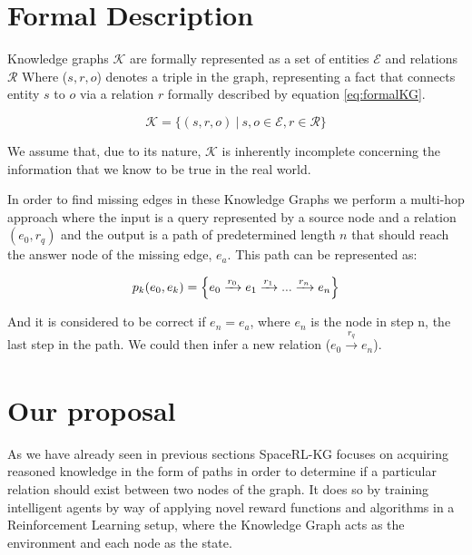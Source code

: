 \section{Formal Description}\label{sec:spacerl-formal_description}


Knowledge graphs $\mathcal{K}$ are formally represented as a set of entities $\mathcal{E}$ and relations $ \mathcal{R}$ Where ($s, r, o$) denotes a triple in the graph, representing a fact that connects entity $s$ to $o$ via a relation $r$ formally described by equation \ref{eq:formalKG}. 

\begin{equation}
\label{eq:formalKG}
\mathcal{K} = \{ (s, r, o) ~|~ s, o \in \mathcal{E}, r \in \mathcal{R} \}
\end{equation}

We assume that, due to its nature, \( \mathcal{K} \) is inherently incomplete concerning the information that we know to be true in the real world.

In order to find missing edges in these Knowledge Graphs we perform a multi-hop approach where the input is a query represented by a source node and a relation $(e_0,r_q)$ and the output is a path of predetermined length $n$ that should reach the answer node of the missing edge, $e_a$. This path can be represented as:

\begin{equation}
\label{eq:formalPath}
p_k(e_0,e_k) =  \Bigl\{ e_0 \xrightarrow[]{r_0} e_1 \xrightarrow[]{r_1} ... \xrightarrow[]{r_n} e_n \Bigl\}
\end{equation}

And it is considered to be correct if $e_n = e_a$, where $e_n$ is the node in step n, the last step in the path. We could then infer a new relation ($e_0\xrightarrow[]{r_q}e_n$).


\section{Our proposal}\label{sec:spacerl-proposal}
As we have already seen in previous sections SpaceRL-KG focuses on acquiring reasoned knowledge in the form of paths in order to determine if a particular relation should exist between two nodes of the graph.
It does so by training intelligent agents by way of applying novel reward functions and algorithms in a Reinforcement Learning setup, where the Knowledge Graph acts as the environment and each node as the state.

